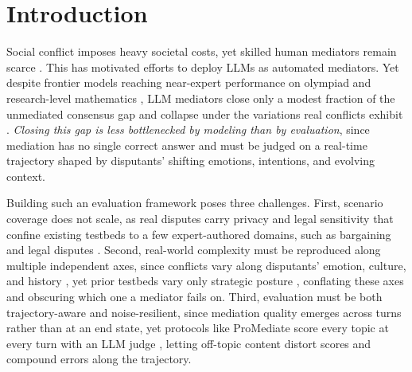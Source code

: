 \documentclass{llmxive}
\begin{document}




\section{Introduction}
\label{sec:introduction}

Social conflict imposes heavy societal costs, yet skilled human mediators remain scarce \citep{tessler2024habermas,ma2025towards}. This has motivated efforts to deploy LLMs as automated mediators. Yet despite frontier models reaching near-expert performance on olympiad and research-level mathematics \citep{dekoninck2026matharena}, LLM mediators close only a modest fraction of the unmediated consensus gap \citep{liu2025promediate} and collapse under the variations real conflicts exhibit \citep{shapira2024clever,wu2026social}. \emph{Closing this gap is less bottlenecked by modeling than by evaluation}, since mediation has no single correct answer and must be judged on a real-time trajectory shaped by disputants' shifting emotions, intentions, and evolving context.

Building such an evaluation framework poses three challenges. First, scenario coverage does not scale, as real disputes carry privacy and legal sensitivity that confine existing testbeds to a few expert-authored domains, such as bargaining \citep{hale2025kodis} and legal disputes \citep{chen2026simulating}. Second, real-world complexity must be reproduced along multiple independent axes, since conflicts vary along disputants' emotion, culture, and history \citep{rakshit2025emotionally,guo2025conflict}, yet prior testbeds vary only strategic posture \citep{liu2025promediate,chen2026simulating}, conflating these axes and obscuring which one a mediator fails on. Third, evaluation must be both trajectory-aware and noise-resilient, since mediation quality emerges across turns rather than at an end state, yet protocols like ProMediate score every topic at every turn with an LLM judge \citep{liu2025promediate}, letting off-topic content distort scores and compound errors along the trajectory.
\end{document}
